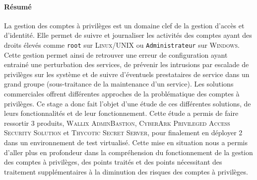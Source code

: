 
\paragraph{Résumé}
La gestion des comptes à privilèges est un domaine clef de la gestion d'accès et d'identité. Elle permet de suivre et journaliser les activités des comptes ayant des droits élevés comme \texttt{root} sur \textsc{Linux/UNIX} ou \texttt{Administrateur} sur \textsc{Windows}. Cette gestion permet ainsi de retrouver une erreur de configuration ayant entrainé une perturbation des services, de prévenir les intrusions par escalade de privilèges sur les système et de suivre d'éventuels prestataires de service dans un grand groupe (sous-traitance de la maintenance d'un service). Les solutions commerciales offrent différentes approches de la problématique des comptes à privilèges. Ce stage a donc fait l'objet d'une étude de ces différentes solutions, de leurs fonctionnalités et de leur fonctionnement. Cette étude a permis de faire ressortir 3 produits, \textsc{Wallix AdminBastion}, \textsc{CyberArk Privileged Access Security Solution} et \textsc{Thycotic Secret Server}, pour finalement en déployer 2 dans un environnement de test virtualisé. Cette mise en situation nous a permis d'aller plus en profondeur dans la compréhension du fonctionnement de la gestion des comptes à privilèges, des points traités et des points nécessitant des traitement supplémentaires à la diminution des risques des comptes à privilèges.

\subsubsection*{}


